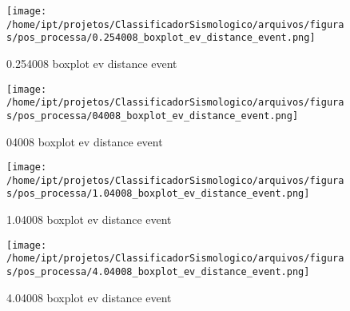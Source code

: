     \begin{figure}[H]
        \centering
        \texttt{[image: /home/ipt/projetos/ClassificadorSismologico/arquivos/figuras/pos\_processa/0.254008\_boxplot\_ev\_distance\_event.png]}
        \caption{0.254008 boxplot ev distance event}
        \label{fig:0.254008_boxplot_ev_distance_event}
    \end{figure}
                

    \begin{figure}[H]
        \centering
        \texttt{[image: /home/ipt/projetos/ClassificadorSismologico/arquivos/figuras/pos\_processa/04008\_boxplot\_ev\_distance\_event.png]}
        \caption{04008 boxplot ev distance event}
        \label{fig:04008_boxplot_ev_distance_event}
    \end{figure}
                

    \begin{figure}[H]
        \centering
        \texttt{[image: /home/ipt/projetos/ClassificadorSismologico/arquivos/figuras/pos\_processa/1.04008\_boxplot\_ev\_distance\_event.png]}
        \caption{1.04008 boxplot ev distance event}
        \label{fig:1.04008_boxplot_ev_distance_event}
    \end{figure}
                

    \begin{figure}[H]
        \centering
        \texttt{[image: /home/ipt/projetos/ClassificadorSismologico/arquivos/figuras/pos\_processa/4.04008\_boxplot\_ev\_distance\_event.png]}
        \caption{4.04008 boxplot ev distance event}
        \label{fig:4.04008_boxplot_ev_distance_event}
    \end{figure}
                